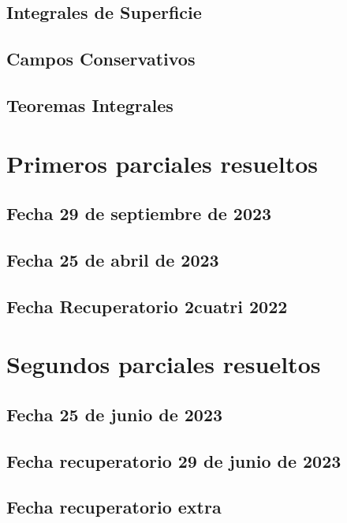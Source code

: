 \documentclass[10pt, a4paper]{report}
\theoremstyle{definition} %
\begin{document}
        \section{Integrales de Superficie}
        \section{Campos Conservativos}
            
        \section{Teoremas Integrales}
            

    \chapter{Primeros parciales resueltos}
        \section{Fecha 29 de septiembre de 2023}
            

        \newpage
        \section{Fecha 25 de abril de 2023}
            

        \newpage
        \section{Fecha Recuperatorio 2cuatri 2022}
            


        \newpage
    \chapter{Segundos parciales resueltos}
        \section{Fecha 25 de junio de 2023}
            

        \newpage
        \section{Fecha recuperatorio 29 de junio de 2023}
            

        \newpage
        \section{Fecha recuperatorio extra}
            
    
\end{document}

